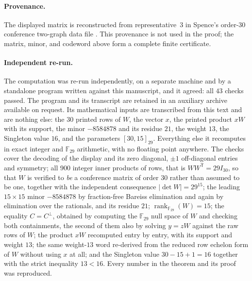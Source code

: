 \documentclass[11pt]{amsart}
\newcommand{\F}{\mathbb{F}}
\DeclareMathOperator{\rank}{rank}
\begin{document}
\paragraph{Provenance.}
The displayed matrix is reconstructed from representative~3 in
Spence's order-$30$ conference two-graph data file \cite{SpenceData}.
This provenance is not used in the proof; the matrix, minor, and
codeword above form a complete finite certificate.

\paragraph{Independent re-run.}
The computation was re-run independently, on a separate machine and by a
standalone program written against this manuscript, and it agreed: all
$43$ checks passed. The program and its transcript are retained in an
auxiliary archive available on request. Its mathematical inputs are
transcribed from this text and are nothing else:
the $30$ printed rows of $W$, the vector $x$, the printed product $xW$
with its support, the minor $-8584878$ and its residue $21$, the weight
$13$, the Singleton value $16$, and the parameters $[30,15]_{29}$.
Everything else it recomputes in exact integer and $\F_{29}$ arithmetic,
with no floating point anywhere. The checks cover the decoding of
the display and its zero diagonal, $\pm1$ off-diagonal entries and
symmetry; all $900$ integer inner products of rows, that is
$WW^{\mathsf T}=29I_{30}$, so that $W$ is verified to \emph{be} a
conference matrix of order $30$ rather than assumed to be one, together
with the independent consequence $\lvert\det W\rvert=29^{15}$; the
leading $15\times15$ minor $-8584878$ by fraction-free Bareiss
elimination and again by elimination over the rationals, and its residue
$21$; $\rank_{\F_{29}}(W)=15$; the equality $C=C^\perp$, obtained by
computing the $\F_{29}$ null space of $W$ and checking both containments,
the second of them also by solving $y=zW$ against the raw rows of $W$;
the product $xW$ recomputed entry by entry, with its support and weight
$13$; the same weight-$13$ word re-derived from the reduced row echelon
form of $W$ without using $x$ at all; and the Singleton value
$30-15+1=16$ together with the strict inequality $13<16$. Every number
in the theorem and its proof was reproduced.
\end{document}
